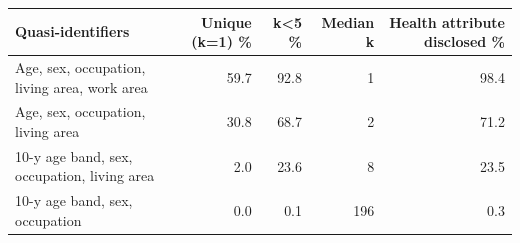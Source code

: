 \begin{tabular}{lrrrr}
\toprule
Quasi-identifiers & Unique (k=1) \% & k<5 \% & Median k & Health attribute disclosed \% \\
\midrule
Age, sex, occupation, living area, work area & 59.7 & 92.8 & 1 & 98.4 \\
Age, sex, occupation, living area & 30.8 & 68.7 & 2 & 71.2 \\
10-y age band, sex, occupation, living area & 2.0 & 23.6 & 8 & 23.5 \\
10-y age band, sex, occupation & 0.0 & 0.1 & 196 & 0.3 \\
\bottomrule
\end{tabular}
